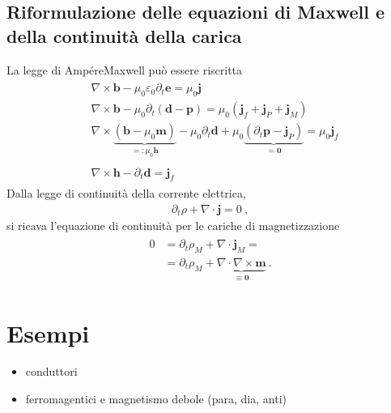 \documentclass[letterpaper,10pt,italian]{jupyterBook}
\begin{document}
\subsection{Riformulazione delle equazioni di Maxwell e della continuità della carica}
\label{\detokenize{ch/media:id1}}
\sphinxAtStartPar
La legge di Ampére\sphinxhyphen{}Maxwell può essere riscritta
\begin{equation*}
\begin{split}\begin{aligned}
 & \nabla \times \mathbf{b} - \mu_0 \varepsilon_0 \partial_t \mathbf{e} = \mu_0 \mathbf{j} \\
 & \nabla \times \mathbf{b} - \mu_0 \partial_t \left( \mathbf{d} - \mathbf{p} \right) = \mu_0 \left( \mathbf{j}_f + \mathbf{j}_P + \mathbf{j}_M \right) \\
 & \nabla \times \underbrace{\left( \mathbf{b} - \mu_0 \mathbf{m} \right)}_{=: \mu_0 \mathbf{h}} - \mu_0 \partial_t \mathbf{d} + \mu_0 \underbrace{\left( \partial_t \mathbf{p} - \mathbf{j}_P \right)}_{= \mathbf{0}} = \mu_0 \mathbf{j}_f  \\ \\
 & \nabla \times \mathbf{h} - \partial_t \mathbf{d} = \mathbf{j}_f
\end{aligned}\end{split}
\end{equation*}
\sphinxAtStartPar
Dalla legge di continuità della corrente elettrica,
\begin{equation*}
\begin{split}\partial_t \rho + \nabla \cdot \mathbf{j} = 0 \ ,\end{split}
\end{equation*}
\sphinxAtStartPar
si ricava l’equazione di continuità per le cariche di magnetizzazione
\begin{equation*}
\begin{split}\begin{aligned}
  0 & = \partial_t \rho_M + \nabla \cdot \mathbf{j}_M = \\
    & = \partial_t \rho_M + \underbrace{ \nabla \cdot \nabla \times \mathbf{m}}_{ \equiv \mathbf{0} } \ .
\end{aligned}\end{split}
\end{equation*}

\section{Esempi}
\label{\detokenize{ch/media:esempi}}\begin{itemize}
\item {} 
\sphinxAtStartPar
conduttori

\item {} 
\sphinxAtStartPar
ferromagentici e magnetismo debole (para\sphinxhyphen{}, dia\sphinxhyphen{}, anti\sphinxhyphen{})

\end{itemize}
\end{document}
